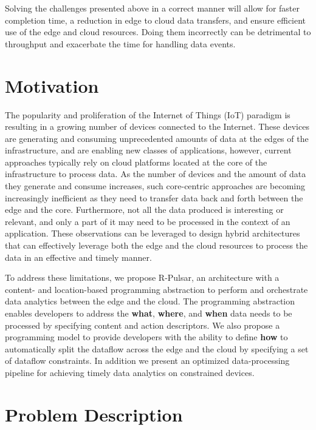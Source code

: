 Solving the challenges presented above in a correct manner will allow for faster completion time, a reduction in edge to cloud data transfers, and ensure efficient use of the edge and cloud resources. Doing them incorrectly can be detrimental to throughput and exacerbate the time for handling data events.
 
\section{Motivation}

The popularity and proliferation of the Internet of Things (IoT) paradigm is resulting in a growing number of devices connected to the Internet. These devices are generating and consuming unprecedented amounts of data at the edges of the infrastructure, and are enabling new classes of applications, however, current approaches typically rely on cloud platforms located at the core of the infrastructure to process data. As the number of devices and the amount of data they generate and consume increases, such core-centric approaches are becoming increasingly inefficient as they need to transfer data back and forth between the edge and the core. Furthermore, not all the data produced is interesting or relevant, and only a part of it may need to be processed in the context of an application. These observations can be leveraged to design hybrid architectures that can effectively leverage both the edge and the cloud resources to process the data in an effective and timely manner\cite{ahmed2017role, satyanarayanan2015edge}.

To address these limitations, we propose R-Pulsar, an architecture with a content- and location-based programming abstraction to perform and orchestrate data analytics between the edge and the cloud. The programming abstraction enables developers to address the \textbf{what}, \textbf{where}, and \textbf{when} data needs to be processed by specifying content and action descriptors. We also propose a programming model to provide developers with the ability to define \textbf{how} to automatically split the dataflow across the edge and the cloud by specifying a set of dataflow constraints. In addition we present an optimized data-processing pipeline for achieving timely data analytics on constrained devices.

\section{Problem Description}

